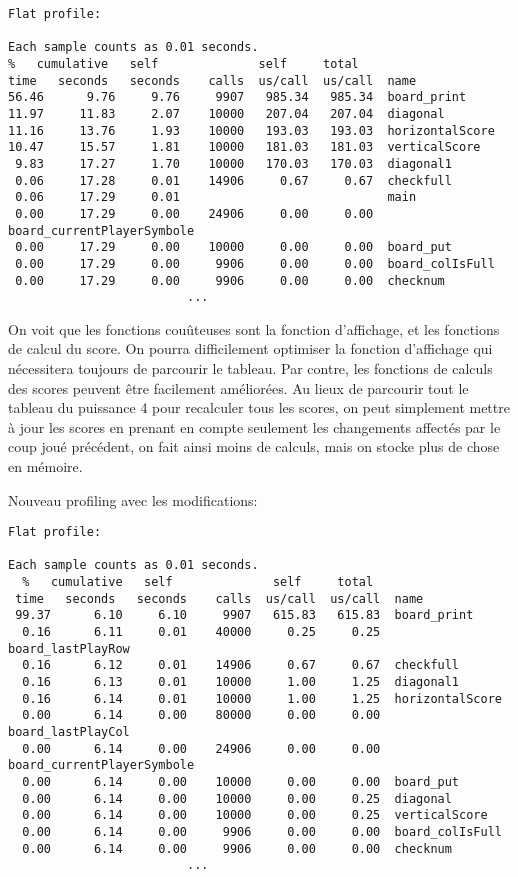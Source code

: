 \documentclass{article}
\begin{document}
\begin{scriptsize}
\begin{lstlisting}
Flat profile:

Each sample counts as 0.01 seconds.
%   cumulative   self              self     total           
time   seconds   seconds    calls  us/call  us/call  name    
56.46      9.76     9.76     9907   985.34   985.34  board_print
11.97     11.83     2.07    10000   207.04   207.04  diagonal
11.16     13.76     1.93    10000   193.03   193.03  horizontalScore
10.47     15.57     1.81    10000   181.03   181.03  verticalScore
 9.83     17.27     1.70    10000   170.03   170.03  diagonal1
 0.06     17.28     0.01    14906     0.67     0.67  checkfull
 0.06     17.29     0.01                             main
 0.00     17.29     0.00    24906     0.00     0.00  board_currentPlayerSymbole
 0.00     17.29     0.00    10000     0.00     0.00  board_put
 0.00     17.29     0.00     9906     0.00     0.00  board_colIsFull
 0.00     17.29     0.00     9906     0.00     0.00  checknum
                         ...
\end{lstlisting}
\end{scriptsize}

On voit que les fonctions couûteuses sont la fonction d'affichage, et les fonctions de calcul du score. On pourra difficilement optimiser la fonction d'affichage qui nécessitera toujours de parcourir le tableau. Par contre, les fonctions de calculs des scores peuvent être facilement améliorées. Au lieux de parcourir tout le tableau du puissance 4 pour recalculer tous les scores, on peut simplement mettre à jour les scores en prenant en compte seulement les changements affectés par le coup joué précédent, on fait ainsi moins de calculs, mais on stocke plus de chose en mémoire.

Nouveau profiling avec les modifications:

\begin{scriptsize}
\begin{lstlisting}
Flat profile:

Each sample counts as 0.01 seconds.
  %   cumulative   self              self     total           
 time   seconds   seconds    calls  us/call  us/call  name    
 99.37      6.10     6.10     9907   615.83   615.83  board_print
  0.16      6.11     0.01    40000     0.25     0.25  board_lastPlayRow
  0.16      6.12     0.01    14906     0.67     0.67  checkfull
  0.16      6.13     0.01    10000     1.00     1.25  diagonal1
  0.16      6.14     0.01    10000     1.00     1.25  horizontalScore
  0.00      6.14     0.00    80000     0.00     0.00  board_lastPlayCol
  0.00      6.14     0.00    24906     0.00     0.00  board_currentPlayerSymbole
  0.00      6.14     0.00    10000     0.00     0.00  board_put
  0.00      6.14     0.00    10000     0.00     0.25  diagonal
  0.00      6.14     0.00    10000     0.00     0.25  verticalScore
  0.00      6.14     0.00     9906     0.00     0.00  board_colIsFull
  0.00      6.14     0.00     9906     0.00     0.00  checknum
                         ...
\end{lstlisting}
\end{scriptsize}
\end{document}
